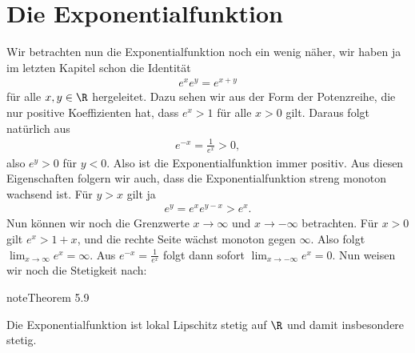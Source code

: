 \documentclass[letterpaper,10pt,english]{jupyterBook}
\begin{document}
\section{Die Exponentialfunktion}
\label{\detokenize{stetigkeit/exp:die-exponentialfunktion}}\label{\detokenize{stetigkeit/exp::doc}}
Wir betrachten nun die Exponentialfunktion noch ein wenig näher, wir haben ja im letzten Kapitel schon die Identität
\begin{equation*}
\begin{split} e^x e^y = e^{x+y}\end{split}
\end{equation*}
für alle \(x,y \in \R\) hergeleitet. Dazu sehen wir aus der Form der Potenzreihe, die nur positive Koeffizienten hat, dass \(e^x > 1\) für alle \(x > 0\) gilt. Daraus folgt natürlich aus
\begin{equation*}
\begin{split} e^{-x} = \frac{1}{e^x} > 0,\end{split}
\end{equation*}
also \(e^y > 0\) für \(y < 0\). Also ist die Exponentialfunktion immer positiv.
Aus diesen Eigenschaften folgern wir auch, dass die Exponentialfunktion streng monoton wachsend ist. Für \(y > x\) gilt ja
\begin{equation*}
\begin{split} e^y = e^x e^{y-x} > e^x.\end{split}
\end{equation*}
Nun können wir noch die Grenzwerte \(x \rightarrow \infty\) und \(x \rightarrow - \infty\) betrachten. Für \(x > 0\) gilt \(
e^x > 1+x\), und die rechte Seite wächst monoton gegen \(\infty\). Also folgt \(\lim_{x \rightarrow \infty} e^x = \infty. \) Aus \(e^{-x} = \frac{1}{e^x} \) folgt dann sofort \(\lim_{x \rightarrow - \infty} e^x = 0. \)
Nun weisen wir noch die Stetigkeit nach:
\label{stetigkeit/exp:theorem-0}
\begin{sphinxadmonition}{note}{Theorem 5.9}



Die Exponentialfunktion ist lokal Lipschitz stetig auf \(\R\) und damit insbesondere stetig.
\end{sphinxadmonition}
\end{document}
